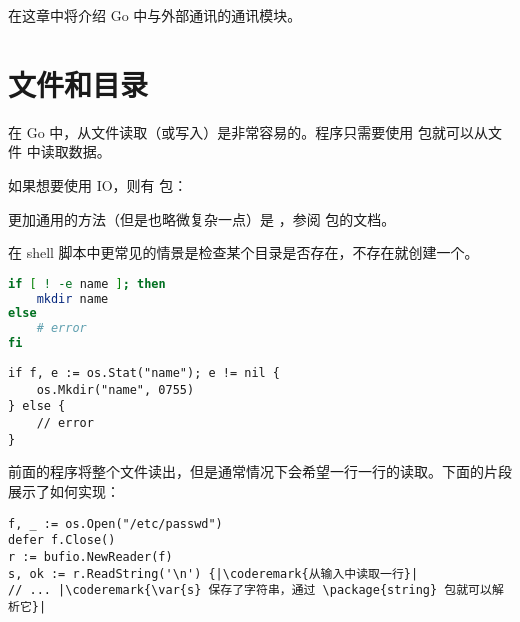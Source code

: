 \noindent{}在这章中将介绍 Go 中与外部通讯的通讯模块。

\section{文件和目录}
在 Go 中，从文件读取（或写入）是非常容易的。程序只需要使用
 包就可以从文件  中读取数据。

\showremarks
如果想要使用 IO，则有
 包：

\showremarks

更加通用的方法（但是也略微复杂一点）是 ，参阅  包的文档。

在 shell 脚本中更常见的情景是检查某个目录是否存在，不存在就创建一个。
\begin{minipage}{.5\textwidth}
\begin{lstlisting}[language=sh,caption={在 shell 中创建目录}]
if [ ! -e name ]; then
    mkdir name
else
    # error
fi
\end{lstlisting}
\end{minipage}
\hspace{1em}
\begin{minipage}{.5\textwidth}
\begin{lstlisting}[caption={在 Go 中创建目录}]
if f, e := os.Stat("name"); e != nil {
    os.Mkdir("name", 0755)
} else {
    // error
}
\end{lstlisting}
\end{minipage}

前面的程序将整个文件读出，但是通常情况下会希望一行一行的读取。下面的片段展示了如何实现：

\begin{lstlisting}
f, _ := os.Open("/etc/passwd")
defer f.Close()
r := bufio.NewReader(f)
s, ok := r.ReadString('\n') {|\coderemark{从输入中读取一行}|
// ... |\coderemark{\var{s} 保存了字符串，通过 \package{string} 包就可以解析它}|
\end{lstlisting}


